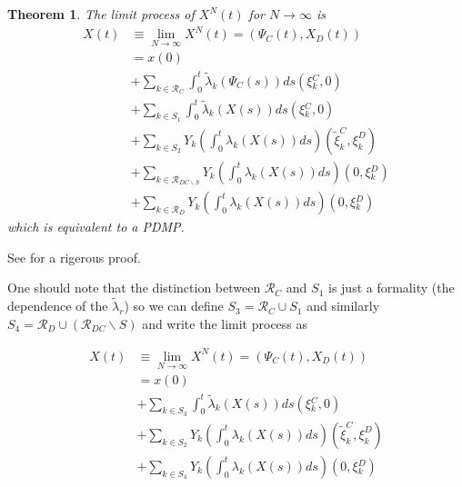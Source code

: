 \documentclass[english]{article}
\begin{document}
\newtheorem{theorem}{Theorem}

\begin{theorem}
\label{theo:theorem_convergence}
The limit process of $X^{N}(t)$ for $N \rightarrow \infty$ is
\begin{align*}
    X(t) &
        \equiv \underset{N \rightarrow \infty}{\lim} X^{N}(t)
            = \left( \Psi_{C}(t), X_{D}(t) \right) \\
    & = x(0) \\
    & + \sum_{k \in \mathcal{R}_{C}} \int_{0}^{t} \tilde{\lambda}_{k}
        \left( \Psi_{C}(s) \right) ds
        \left( \xi{}_{k}^{C}, 0 \right) \\
    & + \sum_{k \in S_{1}} \int_{0}^{t} \tilde{\lambda}_{k}
        \left( X(s) \right) ds
        \left( \xi{}_{k}^{C}, 0 \right) \\
    & + \sum_{k \in S_{2}} Y_{k} \left(
            \int_{0}^{t} \lambda_{k} \left( X(s) \right) ds
        \right) \left( \tilde{\xi}_{k}^{C}, \xi_{k}^{D} \right) \\
    & + \sum_{k \in \mathcal{R}_{DC \backslash S}} Y_{k} \left(
            \int_{0}^{t} \lambda_{k} \left( X(s) \right) ds
        \right) \left( 0, \xi{}_{k}^{D} \right) \\
    & + \sum_{k \in \mathcal{R}_{D}} Y_{k} \left(
            \int_{0}^{t} \lambda_{k} \left( X(s) \right) ds
        \right) \left( 0, \xi{}_{k}^{D} \right)
\end{align*}
which is equivalent to a PDMP.
\end{theorem}

See \cite{crudu2012convergence} for a rigerous proof.



One should note that the distinction between $\mathcal{R}_{C}$ and
$S_{1}$ is just a formality (the dependence of the
$\tilde{\lambda}_{r}$) so we can define
$S_{3}=\mathcal{R}_{C}\cup S_{1}$ and similarly
$S_{4}=\mathcal{R}_{D}\cup(\mathcal{R}_{DC}\backslash S)$ and write
the limit process as

\begin{align*}
X(t) & \equiv \underset{N \rightarrow \infty}{\lim} X^{N}(t)
    = \left(\Psi_{C}(t),X_{D}(t)\right)\\
 & = x(0)\\
 & + \sum_{k \in S_{3}} \int_{0}^{t}
    \tilde{\lambda}_{k} \left( X(s) \right) ds
    \left( \xi{}_{k}^{C}, 0 \right) \\
 & + \sum_{k \in S_{2}} Y_{k} \left(
        \int_{0}^{t} \lambda_{k} \left( X(s) \right) ds
    \right) \left( \tilde{\xi}_{k}^{C}, \xi_{k}^{D} \right) \\
 & + \sum_{k \in S_{4}} Y_{k} \left(
        \int_{0}^{t} \lambda_{k} \left( X(s) \right) ds
    \right) \left( 0, \xi{}_{k}^{D} \right)
\end{align*}
\end{document}
